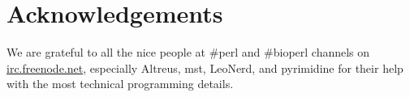\documentclass[10pt,a4paper,onecolumn,article]{memoir}
\begin{document}

  \section{Acknowledgements}
    We are grateful to all the nice people at \#perl and \#bioperl channels on
    \url{irc.freenode.net}, especially Altreus, mst, LeoNerd, and pyrimidine for
    their help with the most technical programming details.

  
  

  \onecolumn
  \label{tab:histone-catalogue}
  
\end{document}
